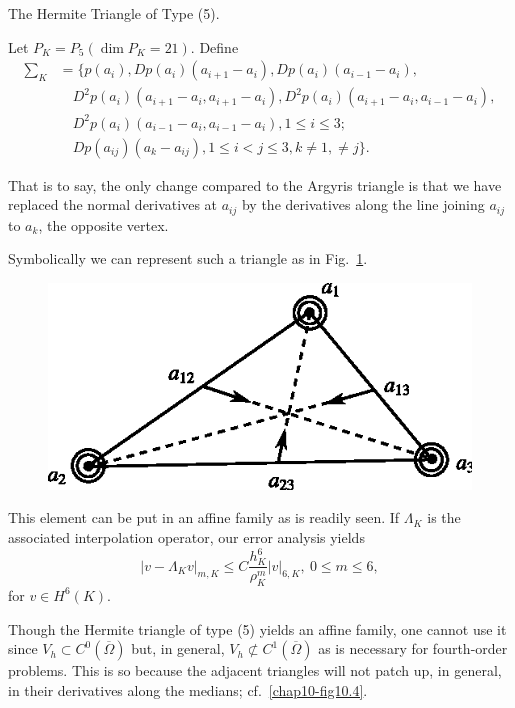 \begin{example}\label{chap10-exam10.2}
The Hermite Triangle of Type (5).

Let $P_{K}=P_{5}(\dim P_{K}=21)$. Define 
\begin{align*}
\sum_{K} &= \Big\{ p(a_{i}),
Dp(a_{i})(a_{i+1}-a_{i}),Dp(a_{i})(a_{i-1}-a_{i}),\\
&\quad D^{2}p(a_{i})(a_{i+1}-a_{i},a_{i+1}-a_{i}),
D^{2}p(a_{i})(a_{i+1}-a_{i},a_{i-1}-a_{i}),\\ 
&\quad D^{2}p(a_{i})(a_{i-1}-a_{i},a_{i-1}-a_{i}),1\leq i\leq 3;\\
&\quad Dp(a_{ij})(a_{k}-a_{ij}), 1\leq i<j\leq 3, k\neq 1, \neq j\Big\}.
\end{align*}\pageoriginale

That is to say, the only change compared to the Argyris triangle is
that we have replaced the normal derivatives at $a_{ij}$ by the
derivatives along the line joining $a_{ij}$ to $a_{k}$, the opposite
vertex.

Symbolically we can represent such a triangle as in
Fig.~\ref{chap10-fig10.3}. 
\begin{figure}[H]
\centering
\includegraphics{figure/fig10.3.eps}
\caption{}\label{chap10-fig10.3}
\end{figure}

This element can be put in an affine family as is readily seen. If
$\Lambda_{K}$ is the associated interpolation operator, our error
analysis yields
\begin{equation*}
|v-\Lambda_{K}v|_{m,K}\leq
C\frac{h^{6}_{K}}{\rho^{m}_{K}}|v|_{6,K},\ 0\leq m\leq
6,\tag{10.10}\label{chap10-eq10.10} 
\end{equation*}
for $v\in H^{6}(K)$.
\end{example}

\begin{remark}\label{chap10-rem10.2}
Though the Hermite triangle of type (5) yields an affine family, one
cannot use it since $V_{h}\subset C^{0}(\overline{\Omega})$ but, in
general, $V_{h}\not\subset C^{1}(\overline{\Omega})$ as is necessary
for fourth-order problems. This is so because the adjacent triangles
will not patch up, in general, in their derivatives along the medians;
cf.~\ref{chap10-fig10.4}. 
\end{remark}

